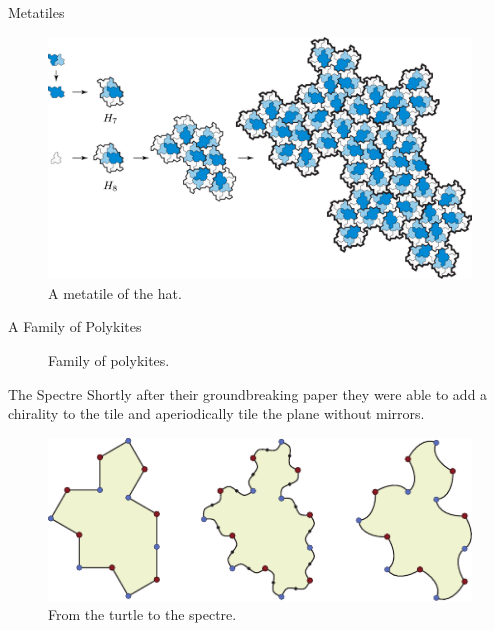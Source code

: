 \documentclass{beamer}
\begin{document}
    

\begin{frame}{Metatiles}
    \begin{figure}
        \centering
        \includegraphics[page=1,width=\textwidth]{images/aperiodic-pdfs/alt_subst.pdf}
        \caption{A metatile of the hat. \cite{Smith_2024}}
        \label{fig:hat-metatile}
    \end{figure}
\end{frame}

\begin{frame}{A Family of Polykites}
    \begin{figure}
        \centering
        
        \caption{Family of polykites. \cite{Smith_2024}}
        \label{fig:other-polykites}
    \end{figure}
\end{frame}

\begin{frame}{The Spectre}
    Shortly after their groundbreaking paper they were able to add a chirality to the tile and aperiodically tile the plane without mirrors. \cite{Smith_2024_chiral}
    \begin{figure}
        \centering
        \includegraphics[width=\linewidth]{images/aperiodic-pdfs/polygon_to_spectre.pdf}
        \caption{From the turtle to the spectre. \cite{Smith_2024_chiral}}
        \label{fig:turle-spectra}
    \end{figure}
\end{frame}
\end{document}
